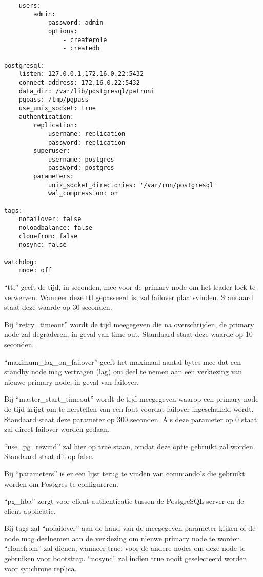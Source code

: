 \begin{lstlisting}
    users:
        admin:
            password: admin
            options:
                - createrole
                - createdb

postgresql:
    listen: 127.0.0.1,172.16.0.22:5432
    connect_address: 172.16.0.22:5432
    data_dir: /var/lib/postgresql/patroni
    pgpass: /tmp/pgpass
    use_unix_socket: true
    authentication:
        replication:
            username: replication
            password: replication
        superuser:
            username: postgres
            password: postgres
        parameters:
            unix_socket_directories: '/var/run/postgresql'
            wal_compression: on

tags:
    nofailover: false
    noloadbalance: false
    clonefrom: false
    nosync: false

watchdog:
    mode: off
\end{lstlisting}

“ttl” geeft de tijd, in seconden, mee voor de primary node om het leader lock te verwerven. Wanneer deze ttl gepasseerd is, zal failover plaatsvinden. Standaard staat deze waarde op 30 seconden.

Bij “retry\_timeout” wordt de tijd meegegeven die na overschrijden, de primary node zal degraderen, in geval van time-out. Standaard staat deze waarde op 10 seconden.

“maximum\_lag\_on\_failover” geeft het maximaal aantal bytes mee dat een standby node mag vertragen (lag) om deel te nemen aan een verkiezing van nieuwe primary node, in geval van failover. 

Bij “master\_start\_timeout” wordt de tijd meegegeven waarop een primary node de tijd krijgt om te herstellen van een fout voordat failover ingeschakeld wordt. Standaard staat deze parameter op 300 seconden. Als deze parameter op 0 staat, zal direct failover worden gedaan.

“use\_pg\_rewind” zal hier op true staan, omdat deze optie gebruikt zal worden. Standaard staat dit op false.

Bij “parameters” is er een lijst terug te vinden van commando's die gebruikt worden om Postgres te configureren.

“pg\_hba” zorgt voor client authenticatie tussen de PostgreSQL server en de client applicatie.

Bij tags zal “nofailover” aan de hand van de meegegeven parameter kijken of de node mag deelnemen aan de verkiezing om nieuwe primary node te worden. “clonefrom” zal dienen, wanneer true, voor de andere nodes om deze node te gebruiken voor bootstrap.
“nosync” zal indien true nooit geselecteerd worden voor synchrone replica.



